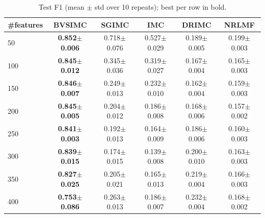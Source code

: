 \begin{table}[t]
\centering
\caption{Test F1 (mean $\pm$ std over 10 repeats); best per row in bold.}
\label{tab:f1}
\begin{tabular}{lccccc}
\toprule
\#features & BVSIMC & SGIMC & IMC & DRIMC & NRLMF \\
\midrule
50 & \textbf{0.852$\pm$0.006} & 0.718$\pm$0.076 & 0.527$\pm$0.029 & 0.189$\pm$0.005 & 0.199$\pm$0.003 \\
100 & \textbf{0.845$\pm$0.012} & 0.345$\pm$0.036 & 0.319$\pm$0.027 & 0.167$\pm$0.004 & 0.165$\pm$0.003 \\
150 & \textbf{0.846$\pm$0.007} & 0.249$\pm$0.013 & 0.232$\pm$0.010 & 0.162$\pm$0.004 & 0.159$\pm$0.003 \\
200 & \textbf{0.845$\pm$0.005} & 0.204$\pm$0.012 & 0.186$\pm$0.008 & 0.168$\pm$0.006 & 0.157$\pm$0.002 \\
250 & \textbf{0.841$\pm$0.003} & 0.192$\pm$0.013 & 0.164$\pm$0.009 & 0.186$\pm$0.006 & 0.160$\pm$0.003 \\
300 & \textbf{0.839$\pm$0.015} & 0.174$\pm$0.015 & 0.139$\pm$0.008 & 0.200$\pm$0.010 & 0.163$\pm$0.003 \\
350 & \textbf{0.827$\pm$0.025} & 0.205$\pm$0.021 & 0.165$\pm$0.013 & 0.219$\pm$0.004 & 0.166$\pm$0.003 \\
400 & \textbf{0.753$\pm$0.086} & 0.263$\pm$0.013 & 0.186$\pm$0.007 & 0.232$\pm$0.004 & 0.168$\pm$0.002 \\
\bottomrule
\end{tabular}
\end{table}
